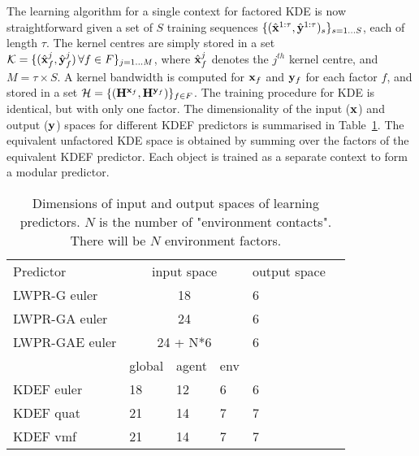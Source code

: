 
The learning algorithm for a single context for factored KDE is now straightforward given a set of $S$ training sequences $\{ (\hat{\mathbf{x}}^{1:\tau} , \hat{\mathbf{y}}^{1:\tau})_s \}_{s = 1 \ldots S}$, each of length $\tau$. The kernel centres are simply stored in a set $\mathcal{K} = \{ ( \hat{\mathbf{x}}^j_f ,  \hat{\mathbf{y}}^j_f ) \, \forall f \in F \}_{ j = 1 \ldots M}$, where $\hat{\mathbf{x}}^j_f$ denotes the $j^{th}$ kernel centre, and $M= \tau \times S$. A kernel bandwidth is computed for $\mathbf{x}_f$ and $\mathbf{y}_f$ for each factor $f$, and stored in a set $\mathcal{H} = \{ (\mathbf{H}^{\mathbf{x}_f},  \mathbf{H}^{\mathbf{y}_f} ) \}_{f \in F}$. The training procedure for KDE is identical, but with only one factor. The dimensionality of the input ($\mathbf{x}$) and output ($\mathbf{y}$) spaces for different KDEF predictors is summarised in Table~\ref{tab:InpOutSpace}. The equivalent unfactored KDE space is obtained by summing over the factors of the equivalent KDEF predictor. Each object is trained as a separate context to form a modular predictor.

\begin{table}[b]
\begin{center}
\begin{tabular}{|l|l|l|l|l|l|}
\cline{1-5}
Predictor & \multicolumn{3}{|c|}{input space } & output space \\
\cline{1-5}
LWPR-G euler & \multicolumn{3}{|c|}{18} & 6 \\
LWPR-GA euler & \multicolumn{3}{|c|}{24} & 6 \\
LWPR-GAE euler & \multicolumn{3}{|c|}{24 + N*6} & 6 \\
\cline{1-5}
\cline{2-4}
 & global & agent & env & \\
\cline{1-5}
KDEF euler & 18 & 12 & 6 & 6 \\
KDEF quat & 21 & 14 & 7 & 7 \\
KDEF vmf & 21 & 14 & 7 & 7 \\
\cline{1-5}
\end{tabular}
\end{center}
\caption[Input/output space]{Dimensions of input and output spaces
of learning predictors. $N$ is the number of
"environment contacts". There will be $N$ environment factors.}\label{tab:InpOutSpace}
\end{table}



